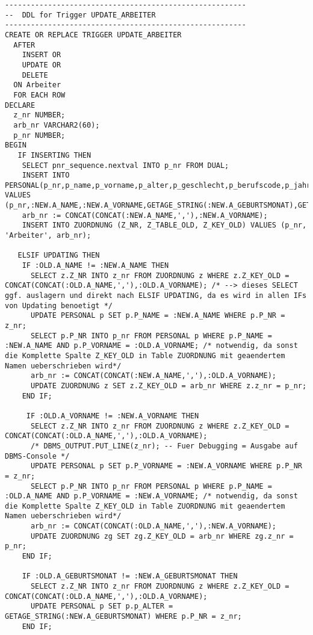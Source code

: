 \documentclass{scrartcl}
\begin{document}
\begin{lstlisting}
--------------------------------------------------------
--  DDL for Trigger UPDATE_ARBEITER
--------------------------------------------------------
CREATE OR REPLACE TRIGGER UPDATE_ARBEITER
  AFTER 
    INSERT OR 
    UPDATE OR 
    DELETE 
  ON Arbeiter
  FOR EACH ROW
DECLARE
  z_nr NUMBER;
  arb_nr VARCHAR2(60);
  p_nr NUMBER;
BEGIN
   IF INSERTING THEN
    SELECT pnr_sequence.nextval INTO p_nr FROM DUAL;
    INSERT INTO PERSONAL(p_nr,p_name,p_vorname,p_alter,p_geschlecht,p_berufscode,p_jahreseinkommen) VALUES (p_nr,:NEW.A_NAME,:NEW.A_VORNAME,GETAGE_STRING(:NEW.A_GEBURTSMONAT),GETGENDERCODE('unbekannt',:NEW.A_VORNAME),GETJOBCODE('Arbeiter'),GETMONEY(:NEW.A_STUNDENLOHN*4*40));
    arb_nr := CONCAT(CONCAT(:NEW.A_NAME,','),:NEW.A_VORNAME);
    INSERT INTO ZUORDNUNG (Z_NR, Z_TABLE_OLD, Z_KEY_OLD) VALUES (p_nr, 'Arbeiter', arb_nr);
    
   ELSIF UPDATING THEN
    IF :OLD.A_NAME != :NEW.A_NAME THEN
      SELECT z.Z_NR INTO z_nr FROM ZUORDNUNG z WHERE z.Z_KEY_OLD = CONCAT(CONCAT(:OLD.A_NAME,','),:OLD.A_VORNAME); /* --> dieses SELECT ggf. auslagern und direkt nach ELSIF UPDATING, da es wird in allen IFs von Updating benoetigt */
      UPDATE PERSONAL p SET p.P_NAME = :NEW.A_NAME WHERE p.P_NR = z_nr;
      SELECT p.P_NR INTO p_nr FROM PERSONAL p WHERE p.P_NAME = :NEW.A_NAME AND p.P_VORNAME = :OLD.A_VORNAME; /* notwendig, da sonst die Komplette Spalte Z_KEY_OLD in Table ZUORDNUNG mit geaendertem Namen ueberschrieben wird*/
      arb_nr := CONCAT(CONCAT(:NEW.A_NAME,','),:OLD.A_VORNAME);
      UPDATE ZUORDNUNG z SET z.Z_KEY_OLD = arb_nr WHERE z.z_nr = p_nr;
    END IF;
    
     IF :OLD.A_VORNAME != :NEW.A_VORNAME THEN
      SELECT z.Z_NR INTO z_nr FROM ZUORDNUNG z WHERE z.Z_KEY_OLD = CONCAT(CONCAT(:OLD.A_NAME,','),:OLD.A_VORNAME);
      /* DBMS_OUTPUT.PUT_LINE(z_nr); -- Fuer Debugging = Ausgabe auf DBMS-Console */
      UPDATE PERSONAL p SET p.P_VORNAME = :NEW.A_VORNAME WHERE p.P_NR = z_nr;
      SELECT p.P_NR INTO p_nr FROM PERSONAL p WHERE p.P_NAME = :OLD.A_NAME AND p.P_VORNAME = :NEW.A_VORNAME; /* notwendig, da sonst die Komplette Spalte Z_KEY_OLD in Table ZUORDNUNG mit geaendertem Namen ueberschrieben wird*/
      arb_nr := CONCAT(CONCAT(:OLD.A_NAME,','),:NEW.A_VORNAME);
      UPDATE ZUORDNUNG zg SET zg.Z_KEY_OLD = arb_nr WHERE zg.z_nr = p_nr;
    END IF;
    
    IF :OLD.A_GEBURTSMONAT != :NEW.A_GEBURTSMONAT THEN
      SELECT z.Z_NR INTO z_nr FROM ZUORDNUNG z WHERE z.Z_KEY_OLD = CONCAT(CONCAT(:OLD.A_NAME,','),:OLD.A_VORNAME);
      UPDATE PERSONAL p SET p.p_ALTER = GETAGE_STRING(:NEW.A_GEBURTSMONAT) WHERE p.P_NR = z_nr;
    END IF;


\end{lstlisting}
\end{document}
